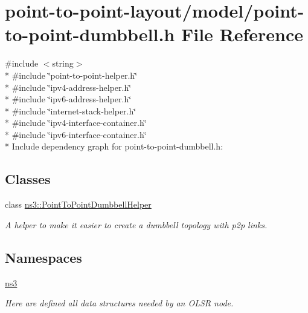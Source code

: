 \hypertarget{point-to-point-dumbbell_8h}{}\section{point-\/to-\/point-\/layout/model/point-\/to-\/point-\/dumbbell.h File Reference}
\label{point-to-point-dumbbell_8h}
{\ttfamily \#include $<$string$>$}\\*
{\ttfamily \#include \char`\"{}point-\/to-\/point-\/helper.\+h\char`\"{}}\\*
{\ttfamily \#include \char`\"{}ipv4-\/address-\/helper.\+h\char`\"{}}\\*
{\ttfamily \#include \char`\"{}ipv6-\/address-\/helper.\+h\char`\"{}}\\*
{\ttfamily \#include \char`\"{}internet-\/stack-\/helper.\+h\char`\"{}}\\*
{\ttfamily \#include \char`\"{}ipv4-\/interface-\/container.\+h\char`\"{}}\\*
{\ttfamily \#include \char`\"{}ipv6-\/interface-\/container.\+h\char`\"{}}\\*
Include dependency graph for point-\/to-\/point-\/dumbbell.h\+:
\subsection*{Classes}
\begin{DoxyCompactItemize}
\item 
class \hyperlink{classns3_1_1PointToPointDumbbellHelper}{ns3\+::\+Point\+To\+Point\+Dumbbell\+Helper}
\begin{DoxyCompactList}\small\item\em A helper to make it easier to create a dumbbell topology with p2p links. \end{DoxyCompactList}\end{DoxyCompactItemize}
\subsection*{Namespaces}
\begin{DoxyCompactItemize}
\item 
 \hyperlink{namespacens3}{ns3}
\begin{DoxyCompactList}\small\item\em Here are defined all data structures needed by an O\+L\+SR node. \end{DoxyCompactList}\end{DoxyCompactItemize}
